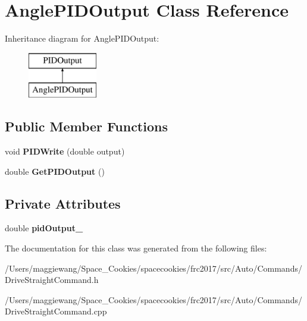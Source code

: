 \hypertarget{class_angle_p_i_d_output}{}\section{Angle\+P\+I\+D\+Output Class Reference}
\label{class_angle_p_i_d_output}
Inheritance diagram for Angle\+P\+I\+D\+Output\+:\begin{figure}[H]
\begin{center}
\leavevmode
\includegraphics[height=2.000000cm]{class_angle_p_i_d_output}
\end{center}
\end{figure}
\subsection*{Public Member Functions}
\begin{DoxyCompactItemize}
\item 
\mbox{\label{class_angle_p_i_d_output_a2e86b8426e4e2c4e0c04343cf7f6a786}} 
void {\bfseries P\+I\+D\+Write} (double output)
\item 
\mbox{\label{class_angle_p_i_d_output_a405e91653c027b3df6e387ea5987f095}} 
double {\bfseries Get\+P\+I\+D\+Output} ()
\end{DoxyCompactItemize}
\subsection*{Private Attributes}
\begin{DoxyCompactItemize}
\item 
\mbox{\label{class_angle_p_i_d_output_a0cedb94e093c1e5f4b71de6b8b8974ab}} 
double {\bfseries pid\+Output\+\_\+}
\end{DoxyCompactItemize}


The documentation for this class was generated from the following files\+:\begin{DoxyCompactItemize}
\item 
/\+Users/maggiewang/\+Space\+\_\+\+Cookies/spacecookies/frc2017/src/\+Auto/\+Commands/Drive\+Straight\+Command.\+h\item 
/\+Users/maggiewang/\+Space\+\_\+\+Cookies/spacecookies/frc2017/src/\+Auto/\+Commands/Drive\+Straight\+Command.\+cpp\end{DoxyCompactItemize}
